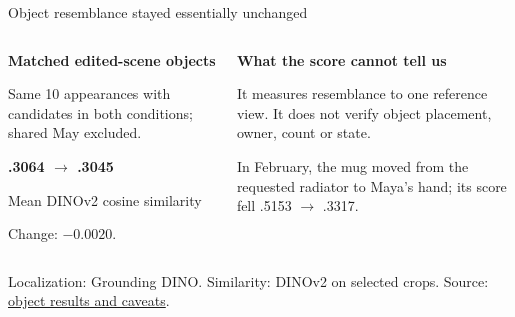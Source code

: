 \documentclass[aspectratio=169,11pt]{beamer}
\newcommand{\source}[1]{\par\vfill{\fontsize{7}{8}\selectfont\color{muted}#1\par}}
\newcommand{\repo}[2]{\href{https://github.com/aking526/ai-camera-roll/blob/84bd89bb9e947a0866aca6654ffc04a3a5d9119f/#1}{#2}}
\begin{document}
\begin{frame}{Object resemblance stayed essentially unchanged}
\begin{columns}[t,onlytextwidth]
\begin{column}{.47\textwidth}
\textbf{Matched edited-scene objects}\par
\vspace{4mm}
Same 10 appearances with candidates in both conditions; shared May excluded.\par
\vspace{5mm}
\Large\textbf{.3064 $\rightarrow$ .3045}\par
Mean DINOv2 cosine similarity\par
\vspace{3mm}
Change: $-0.0020$.
\end{column}
\begin{column}{.47\textwidth}
\textbf{What the score cannot tell us}\par
\vspace{4mm}
It measures resemblance to one reference view. It does not verify object placement, owner, count or state.\par
\vspace{4mm}
In February, the mug moved from the requested radiator to Maya's hand; its score fell .5153 $\rightarrow$ .3317.
\end{column}
\end{columns}
\source{Localization: Grounding DINO. Similarity: DINOv2 on selected crops. Source: \repo{experiments/iteration_01_portrait_retention_2026-11-04/ANALYSIS.md}{object results and caveats}.}
\end{frame}
\end{document}
